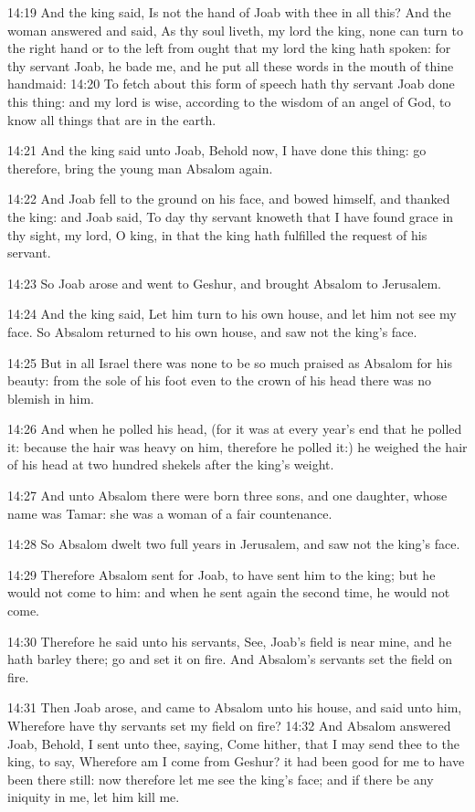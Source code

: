 14:19 And the king said, Is not the hand of Joab with thee in all
this?  And the woman answered and said, As thy soul liveth, my lord
the king, none can turn to the right hand or to the left from ought
that my lord the king hath spoken: for thy servant Joab, he bade me,
and he put all these words in the mouth of thine handmaid: 14:20 To
fetch about this form of speech hath thy servant Joab done this thing:
and my lord is wise, according to the wisdom of an angel of God, to
know all things that are in the earth.

14:21 And the king said unto Joab, Behold now, I have done this thing:
go therefore, bring the young man Absalom again.

14:22 And Joab fell to the ground on his face, and bowed himself, and
thanked the king: and Joab said, To day thy servant knoweth that I
have found grace in thy sight, my lord, O king, in that the king hath
fulfilled the request of his servant.

14:23 So Joab arose and went to Geshur, and brought Absalom to
Jerusalem.

14:24 And the king said, Let him turn to his own house, and let him
not see my face. So Absalom returned to his own house, and saw not the
king's face.

14:25 But in all Israel there was none to be so much praised as
Absalom for his beauty: from the sole of his foot even to the crown of
his head there was no blemish in him.

14:26 And when he polled his head, (for it was at every year's end
that he polled it: because the hair was heavy on him, therefore he
polled it:) he weighed the hair of his head at two hundred shekels
after the king's weight.

14:27 And unto Absalom there were born three sons, and one daughter,
whose name was Tamar: she was a woman of a fair countenance.

14:28 So Absalom dwelt two full years in Jerusalem, and saw not the
king's face.

14:29 Therefore Absalom sent for Joab, to have sent him to the king;
but he would not come to him: and when he sent again the second time,
he would not come.

14:30 Therefore he said unto his servants, See, Joab's field is near
mine, and he hath barley there; go and set it on fire. And Absalom's
servants set the field on fire.

14:31 Then Joab arose, and came to Absalom unto his house, and said
unto him, Wherefore have thy servants set my field on fire?  14:32 And
Absalom answered Joab, Behold, I sent unto thee, saying, Come hither,
that I may send thee to the king, to say, Wherefore am I come from
Geshur? it had been good for me to have been there still: now
therefore let me see the king's face; and if there be any iniquity in
me, let him kill me.

